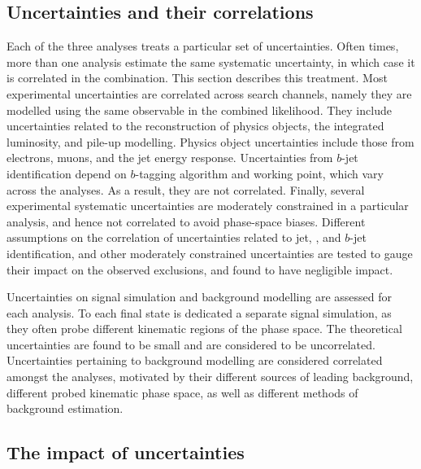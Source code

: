 \subsection{Uncertainties and their correlations}

Each of the three analyses treats a particular set of uncertainties. 
Often times, more than one analysis estimate the same systematic uncertainty, in which case it is correlated in the combination. 
This section describes this treatment. 
Most experimental uncertainties are correlated across search channels, namely they are modelled using the same observable in the combined likelihood. 
They include uncertainties related to the reconstruction of physics objects, the integrated luminosity, and pile-up modelling. 
Physics object uncertainties include those from electrons, muons, and the jet energy response. 
Uncertainties from $b$-jet identification depend on $b$-tagging algorithm and working point, which vary across the analyses. 
As a result, they are not correlated. 
Finally, several experimental systematic uncertainties are moderately constrained in a particular analysis, and hence not correlated to avoid phase-space biases. 
Different assumptions on the correlation of uncertainties related to jet, \met, and $b$-jet identification, and other moderately constrained uncertainties are tested to gauge their impact on the observed exclusions, and found to have negligible impact. 

Uncertainties on signal simulation and background modelling are assessed for each analysis. To each final state is dedicated a separate signal simulation, as they often probe different kinematic regions of the phase space. The theoretical uncertainties are found to be small and are considered to be uncorrelated. Uncertainties pertaining to background modelling are considered correlated amongst the analyses, motivated by their different sources of leading background, different probed kinematic phase space, as well as different methods of background estimation.

\subsection{The impact of uncertainties}

